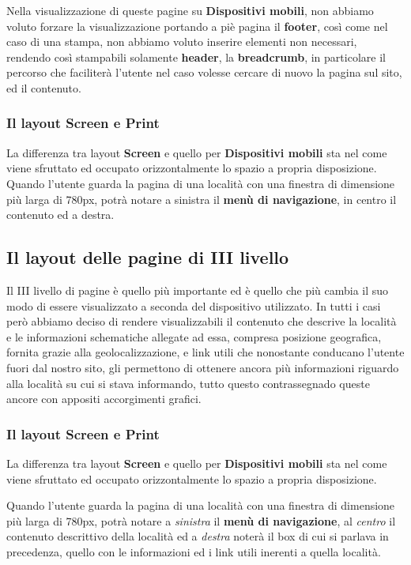 Nella visualizzazione di queste pagine su \textbf{Dispositivi mobili}, non
abbiamo voluto forzare la visualizzazione portando a piè pagina il
\textbf{footer}, così come nel caso di una stampa, non abbiamo voluto inserire
elementi non necessari, rendendo così stampabili solamente \textbf{header},
la \textbf{breadcrumb}, in particolare il percorso che faciliterà l'utente nel
caso volesse cercare di nuovo la pagina sul sito, ed il contenuto.

\subsubsection{Il layout Screen e Print}\label{sec:Pres-IIliv-screenPrint}
La differenza tra layout \textbf{Screen} e quello per \textbf{Dispositivi
mobili} sta nel come viene sfruttato ed occupato orizzontalmente lo spazio a
propria disposizione.
Quando l'utente guarda la pagina di una località con una finestra di
dimensione più larga di 780px, potrà notare a sinistra il \textbf{menù di
navigazione}, in centro il contenuto ed a destra.

\subsection{Il layout delle pagine di III livello}\label{sec:Pres-IIIliv}
Il III livello di pagine è quello più importante ed è quello che più cambia il
suo modo di essere visualizzato a seconda del dispositivo utilizzato.
In tutti i casi però abbiamo deciso di rendere visualizzabili il contenuto che
descrive la località e le informazioni schematiche allegate ad essa, compresa
posizione geografica, fornita grazie alla geolocalizzazione, e link utili che
nonostante conducano l'utente fuori dal nostro sito, gli permettono di
ottenere ancora più informazioni riguardo alla località su cui si stava
informando, tutto questo contrassegnado queste ancore con appositi
accorgimenti grafici.

\subsubsection{Il layout Screen e Print}\label{sec:Pres-IIIliv-Screen}
La differenza tra layout \textbf{Screen} e quello per \textbf{Dispositivi
mobili} sta nel come viene sfruttato ed occupato orizzontalmente lo spazio a
propria disposizione.

Quando l'utente guarda la pagina di una località con una finestra di
dimensione più larga di 780px, potrà notare a \textit{sinistra} il
\textbf{menù di navigazione}, al \textit{centro} il contenuto descrittivo
della località ed a \textit{destra} noterà il box di cui si parlava in
precedenza, quello con le informazioni ed i link utili inerenti a quella
località.

